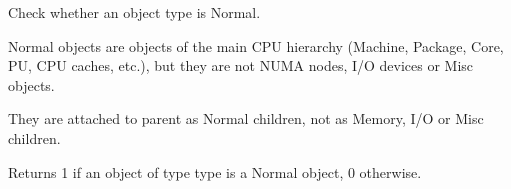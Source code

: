 Check whether an object type is Normal. 

Normal objects are objects of the main C\+PU hierarchy (Machine, Package, Core, PU, C\+PU caches, etc.), but they are not N\+U\+MA nodes, I/O devices or Misc objects.

They are attached to parent as Normal children, not as Memory, I/O or Misc children.

\begin{DoxyReturn}{Returns}
1 if an object of type {\ttfamily type} is a Normal object, 0 otherwise. 
\end{DoxyReturn}
